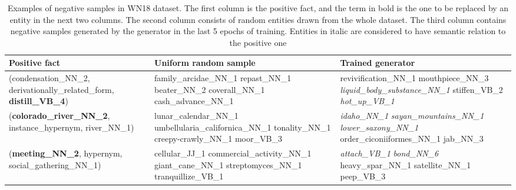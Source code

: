 \documentclass[11pt,a4paper]{article}
\begin{document}
\begin{table}[t]
\centering
\begin{tabular}{|p{48mm}|p{48mm}|p{48mm}|}
\hline
\textbf{Positive fact} & \textbf{Uniform random sample} & \textbf{Trained generator}  \\ \hline
(condensation\_NN\_2, \newline derivationally\_related\_form, \newline \textbf{distill\_VB\_4}) & family\_arcidae\_NN\_1 \newline repast\_NN\_1 \newline beater\_NN\_2 \newline coverall\_NN\_1 \newline cash\_advance\_NN\_1 & revivification\_NN\_1 \newline mouthpiece\_NN\_3 \newline \textit{liquid\_body\_substance\_NN\_1} \newline stiffen\_VB\_2 \newline \textit{hot\_up\_VB\_1} \\ \hline
(\textbf{colorado\_river\_NN\_2}, \newline instance\_hypernym, \newline river\_NN\_1) & lunar\_calendar\_NN\_1 \newline umbellularia\_californica\_NN\_1 \newline tonality\_NN\_1 \newline creepy-crawly\_NN\_1 \newline moor\_VB\_3 & \textit{idaho\_NN\_1} \newline \textit{sayan\_mountains\_NN\_1} \newline \textit{lower\_saxony\_NN\_1} \newline order\_ciconiiformes\_NN\_1 \newline jab\_NN\_3  \\ \hline
(\textbf{meeting\_NN\_2}, \newline hypernym, \newline social\_gathering\_NN\_1) & cellular\_JJ\_1 \newline commercial\_activity\_NN\_1 \newline giant\_cane\_NN\_1 \newline streptomyces\_NN\_1 \newline tranquillize\_VB\_1 & \textit{attach\_VB\_1} \newline \textit{bond\_NN\_6} \newline heavy\_spar\_NN\_1 \newline satellite\_NN\_1 \newline peep\_VB\_3 \\ \hline
\end{tabular}
\caption{Examples of negative samples in WN18 dataset. The first column is the positive fact, and the term in bold is the one to be replaced by an entity in the next two columns. The second column consists of random entities drawn from the whole dataset. The third column contains negative samples generated by the generator in the last 5 epochs of training. Entities in italic are considered to have semantic relation to the positive one}
\label{tab:examples}
\end{table}
\end{document}
